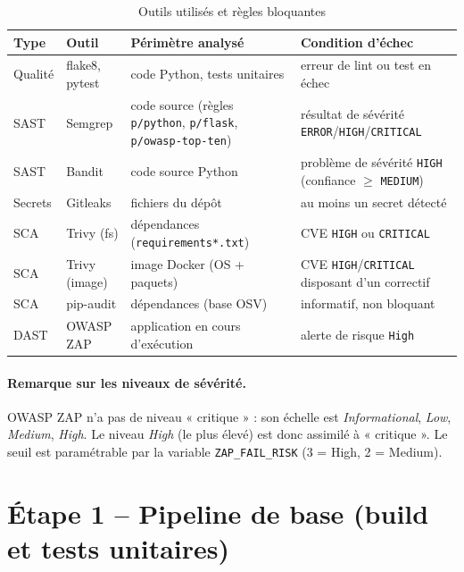 \documentclass[11pt,a4paper]{article}
\newcommand{\fichier}[1]{\texttt{#1}}
\begin{document}
\begin{table}[H]
\centering
\caption{Outils utilisés et règles bloquantes}
\label{tab:outils}
\small
\begin{tabularx}{\linewidth}{l l X X}
\toprule
\textbf{Type} & \textbf{Outil} & \textbf{Périmètre analysé} & \textbf{Condition d'échec} \\
\midrule
Qualité & flake8, pytest & code Python, tests unitaires & erreur de lint ou test en échec \\
SAST & Semgrep & code source (règles \texttt{p/python}, \texttt{p/flask}, \texttt{p/owasp-top-ten}) & résultat de sévérité \texttt{ERROR}/\texttt{HIGH}/\texttt{CRITICAL} \\
SAST & Bandit & code source Python & problème de sévérité \texttt{HIGH} (confiance $\geq$ \texttt{MEDIUM}) \\
Secrets & Gitleaks & fichiers du dépôt & au moins un secret détecté \\
SCA & Trivy (fs) & dépendances (\texttt{requirements*.txt}) & CVE \texttt{HIGH} ou \texttt{CRITICAL} \\
SCA & Trivy (image) & image Docker (OS + paquets) & CVE \texttt{HIGH}/\texttt{CRITICAL} disposant d'un correctif \\
SCA & pip-audit & dépendances (base OSV) & informatif, non bloquant \\
DAST & OWASP ZAP & application en cours d'exécution & alerte de risque \texttt{High} \\
\bottomrule
\end{tabularx}
\end{table}

\paragraph{Remarque sur les niveaux de sévérité.} OWASP ZAP n'a pas de niveau « critique » : son
échelle est \emph{Informational}, \emph{Low}, \emph{Medium}, \emph{High}. Le niveau \emph{High}
(le plus élevé) est donc assimilé à « critique ». Le seuil est paramétrable par la variable
\fichier{ZAP\_FAIL\_RISK} (3 = High, 2 = Medium).

\section{Étape 1 -- Pipeline de base (build et tests unitaires)}
\end{document}
